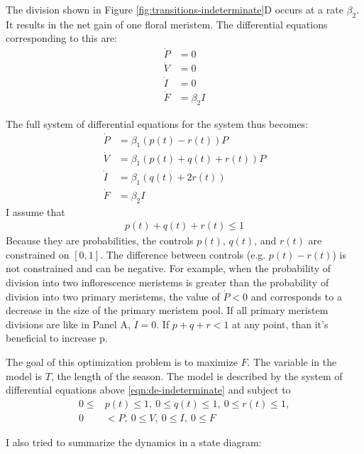 \documentclass[12pt, oneside]{article}   	%
\begin{document}
The division shown in Figure \ref{fig:transitions-indeterminate}D occurs at a rate $\beta_2 $. It results in the net gain of one floral meristem. The differential equations corresponding to this are:
%
\begin{align}
\dot{P} & = 0 \nonumber \\
\dot{V} & = 0      \nonumber \\
\dot{I} & =  0 \nonumber \\
\dot{F} & = \beta_2 I
\end{align}
%

The full system of differential equations for the system thus becomes:
%
\begin{align}
\dot{P} & = \beta_1 (p(t) - r(t)) P  \nonumber \\
\dot{V} & = \beta_1 (p(t) + q(t) + r(t) ) P     \nonumber \\
\dot{I} & =  \beta_1 (q(t) + 2 r(t) ) \nonumber \\
\dot{F} & = \beta_2 I
\label{eqn:de-indeterminate}
\end{align}
%
I assume that 
%
\begin{align}
p(t) + q(t) + r(t) \leq 1
\end{align}
Because they are probabilities, the controls $p(t)$, $q(t)$, and $r(t)$ are constrained on $[0,1]$. The difference between controls (e.g. $p(t) - r(t)$) is not constrained and can be negative. For example, when the probability of division into two inflorescence meristems is greater than the probability of division into two primary meristems, the value of $\dot{P}<0$ and corresponds to a decrease in the size of the primary meristem pool. If all primary meristem divisions are like in Panel A, $\dot{I} = 0$. If $p + q + r < 1$ at any point, than it's beneficial to increase p.

The goal of this optimization problem is to maximize $F$. The variable in the model is $T$, the length of the season. The model is described by the system of differential equations above \ref{eqn:de-indeterminate} and subject to 
%
\begin{align}
0 \leq & p(t) \leq 1,\ 0 \leq q(t) \leq 1,\ 0 \leq r(t) \leq 1,  \nonumber \\
0 & < P,\ 0 \leq V,\ 0 \leq I,\ 0  \leq F 
\label{eqn:constraints-indeterminate}
\end{align}

I also tried to summarize the dynamics in a state diagram:
\end{document}
